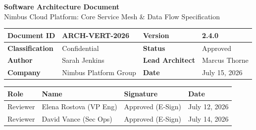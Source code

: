 \documentclass[11pt,a4paper]{article}
\begin{document}
\begin{center}
  \sffamily
  \color{primary}
  {\Huge\bfseries Software Architecture Document}\\[0.3cm]
  {\large\color{secondary}Nimbus Cloud Platform: Core Service Mesh \& Data Flow Specification}\\[0.6cm]
\end{center}

\begin{table}[h]
\centering
\sffamily\small
\begin{tabularx}{\linewidth}{|l|X|l|X|}
\hline
\rowcolor{lightbg}\textbf{Document ID} & ARCH-VERT-2026 & \textbf{Version} & 2.4.0 \\
\hline
\textbf{Classification} & Confidential & \textbf{Status} & Approved \\
\hline
\rowcolor{lightbg}\textbf{Author} & Sarah Jenkins & \textbf{Lead Architect} & Marcus Thorne \\
\hline
\textbf{Company} & Nimbus Platform Group & \textbf{Date} & July 15, 2026 \\
\hline
\end{tabularx}
\end{table}

\begin{table}[h]
\centering
\sffamily\small
\begin{tabularx}{\linewidth}{|l|X|l|X|}
\hline
\rowcolor{lightbg}\textbf{Role} & \textbf{Name} & \textbf{Signature} & \textbf{Date} \\
\hline
Reviewer & Elena Rostova (VP Eng) & Approved (E-Sign) & July 12, 2026 \\
\hline
\rowcolor{lightbg}Reviewer & David Vance (Sec Ops) & Approved (E-Sign) & July 14, 2026 \\
\hline
\end{tabularx}
\end{table}

\vspace{0.4cm}
\begin{abstract}
This document outlines the system architecture for the core service mesh of the Nimbus Cloud Platform. It provides a detailed blueprint of the services managed under the Vertex Engine, detailing routing boundaries, internal state machine flows via the Nexa Gateway, telemetry streaming boundaries, and secure transactional databases managed via Meridian DB. The goal of this architecture is to provide high availability, fault tolerance, and absolute separation of concerns between our data ingress and analytical processing workloads.
\end{abstract}

\newpage





\end{document}
